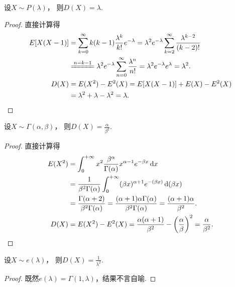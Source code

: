 \begin{proposition}\label{theorem:随机变量的数字特征.泊松分布的方差}
设\(X \sim P(\lambda)\)，
则\(D(X) = \lambda\).
\begin{proof}
直接计算得\begin{align*}
	E[X(X-1)]
	&= \sum_{k=0}^\infty {k(k-1) \frac{\lambda^k}{k!} e^{-\lambda}}
	= \lambda^2 e^{-\lambda} \sum_{k=2}^\infty {\frac{\lambda^{k-2}}{(k-2)!}} \\
	&\xlongequal{n=k-1} \lambda^2 e^{-\lambda} \sum_{n=0}^\infty {\frac{\lambda^n}{n!}}
	= \lambda^2 e^{-\lambda} e^\lambda = \lambda^2. \\
	D(X)
	&= E(X^2) - E^2(X)
	= E[X(X-1)] + E(X) - E^2(X) \\
	&= \lambda^2 + \lambda - \lambda^2 = \lambda.
	\qedhere
\end{align*}
\end{proof}
\end{proposition}

\begin{proposition}\label{theorem:随机变量的数字特征.伽马分布的方差}
设\(X \sim \Gamma(\alpha,\beta)\)，
则\(D(X) = \frac{\alpha}{\beta^2}\).
\begin{proof}
\def\inti{\int_0^{+\infty}}%
直接计算得
\begin{align*}
	E(X^2) &= \int_0^{+\infty} x^2
		\frac{\beta^\alpha}{\Gamma(\alpha)} x^{\alpha-1} e^{-\beta x} \dd{x} \\
	&= \frac{1}{\beta^2 \Gamma(\alpha)}
		\int_0^{+\infty} (\beta x)^{\alpha+1} e^{-(\beta x)} \dd(\beta x) \\
	&= \frac{\Gamma(\alpha+2)}{\beta^2 \Gamma(\alpha)}
	= \frac{(\alpha+1) \alpha \Gamma(\alpha)}{\beta^2 \Gamma(\alpha)}
	= \frac{(\alpha+1) \alpha}{\beta^2}. \\
	D(X) &= E(X^2) - E^2(X)
	= \frac{\alpha (\alpha+1)}{\beta^2} - \left( \frac{\alpha}{\beta} \right)^2
	= \frac{\alpha}{\beta^2}.
	\qedhere
\end{align*}
\end{proof}
\end{proposition}

\begin{proposition}\label{theorem:随机变量的数字特征.指数分布的方差}
设\(X \sim e(\lambda)\)，
则\(D(X) = \frac{1}{\lambda^2}\).
\begin{proof}
既然\(e(\lambda) = \Gamma(1,\lambda)\)，结果不言自喻.
\end{proof}
\end{proposition}

